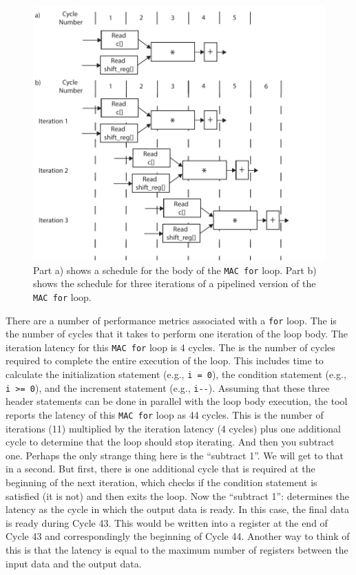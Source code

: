 \begin{figure}
\centering
\includegraphics[width=6in]{images/pipeline_mac}
\caption{Part a) shows a schedule for the body of the \lstinline{MAC for} loop. Part b) shows the schedule for three iterations of a pipelined version of the \lstinline{MAC for} loop.}
\label{fig:pipeline_mac}
\end{figure}

There are a number of performance metrics associated with a \lstinline{for} loop. The  is the number of cycles that it takes to perform one iteration of the loop body. The iteration latency for this \lstinline{MAC for} loop is 4 cycles. The  is the number of cycles required to complete the entire execution of the loop. This includes time to calculate the initialization statement (e.g., \lstinline{i = 0}), the condition statement (e.g., \lstinline{i >= 0}), and the increment statement (e.g., \lstinline{i--}). Assuming that these three header statements can be done in parallel with the loop body execution, the \VHLS tool reports the latency of this \lstinline{MAC for} loop as 44 cycles. This is the  number of iterations (11) multiplied by the iteration latency (4 cycles) plus one additional cycle to determine that the loop should stop iterating. And then you subtract one. Perhaps the only strange thing here is the ``subtract 1''. We will get to that in a second. But first, there is one additional cycle that is required at the beginning of the next iteration, which checks if the condition statement is satisfied (it is not) and then exits the loop. Now the ``subtract 1'': \VHLS determines the latency as the cycle in which the output data is ready. In this case, the final data is ready during Cycle 43. This would be written into a register at the end of Cycle 43 and correspondingly the beginning of Cycle 44.   Another way to think of this is that the latency is equal to the maximum number of registers between the input data and the output data. 

